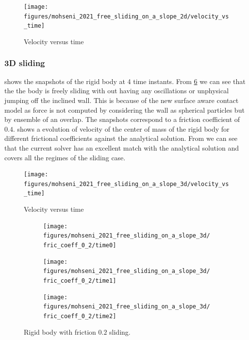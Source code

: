 \documentclass[preprint,12pt]{elsarticle}
\begin{document}
\begin{figure}[!htpb]
  \centering
  \texttt{[image: figures/mohseni\_2021\_free\_sliding\_on\_a\_slope\_2d/velocity\_vs\_time]}
  \caption{Velocity versus time}
\label{fig:results-solid-sliding-velocity-vs-time-2d}
\end{figure}

\subsubsection{3D sliding}
\label{sec:results-3d-sliding}

 shows the snapshots of the rigid body at 4
time instants. From \cref{fig:mohseni-2021-sliding-3d} we can see that the the
body is freely sliding with out having any oscillations or unphysical jumping
off the inclined wall. This is because of the new surface aware contact model
as force is not computed by considering the wall as spherical particles but by
ensemble of an overlap. The snapshots correspond to a friction coefficient of
$0.4$.  shows a evolution of
velocity of the center of mass of the rigid body for different frictional
coefficients against the analytical solution. From
 we can see that the current
solver has an excellent match with the analytical solution and covers all the
regimes of the sliding case.
\begin{figure}[!htpb]
  \centering
  \texttt{[image: figures/mohseni\_2021\_free\_sliding\_on\_a\_slope\_3d/velocity\_vs\_time]}
  \caption{Velocity versus time}
\label{fig:results-solid-sliding-velocity-vs-time-3d}
\end{figure}

\begin{figure}[!htpb]
  \centering
  \begin{subfigure}{0.48\textwidth}
    \centering
    \texttt{[image: figures/mohseni\_2021\_free\_sliding\_on\_a\_slope\_3d/fric\_coeff\_0\_2/time0]}
    \label{fig:passing-0}
  \end{subfigure}
  \begin{subfigure}{0.48\textwidth}
    \centering
    \texttt{[image: figures/mohseni\_2021\_free\_sliding\_on\_a\_slope\_3d/fric\_coeff\_0\_2/time1]}
    \label{fig:passing-1}
  \end{subfigure}

  \begin{subfigure}{0.48\textwidth}
    \centering
    \texttt{[image: figures/mohseni\_2021\_free\_sliding\_on\_a\_slope\_3d/fric\_coeff\_0\_2/time2]}
    \label{fig:passing-2}
  \end{subfigure}
  \caption{Rigid body with friction $0.2$ sliding.}
\label{fig:mohseni-2021-sliding-3d}
\end{figure}
\end{document}
